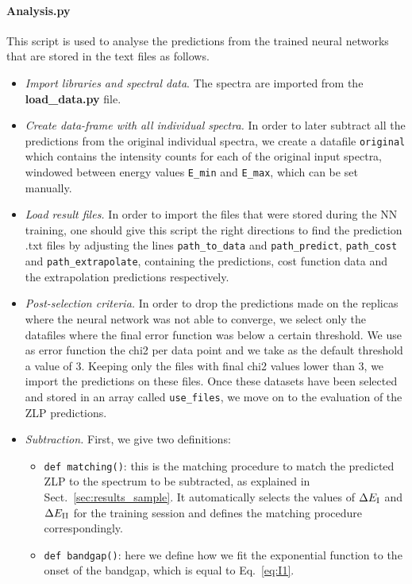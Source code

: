 \noindent
\paragraph{Analysis.py}
This script is used to analyse the predictions from the trained
neural networks that are stored in the text files as follows.

\begin{itemize}
  
\item {\it Import libraries and spectral data}.
The spectra are imported from the {\bf load\_data.py} file.

\item {\it Create data-frame with all individual spectra.}
In order to later subtract all the predictions from the original individual spectra, we create a datafile
{\tt original} which contains the intensity counts for each of the original input spectra, windowed 
between energy values {\tt E\_min} and {\tt E\_max}, which can be set manually.

\item {\it Load result files.}
In order to import the files that were stored during the NN training, 
one should give this script the right directions to find the prediction .txt files
by adjusting the lines {\tt path\_to\_data} and {\tt path\_predict}, {\tt path\_cost} and {\tt path\_extrapolate}, 
containing the predictions, cost function data and the extrapolation predictions respectively.
%

\item {\it Post-selection criteria.}
In order to drop the predictions made on the replicas where the neural network was not able to converge,
we select only the datafiles where the final error function was below a certain threshold. 
%
We use as error function the chi2 per data point and we take as the default threshold a value of 3. 
%
Keeping only the files with final chi2 values lower than 3, we import the predictions on these files.
%
Once these datasets have been selected and stored in an array called {\tt use\_files},
we move on to the evaluation of the ZLP predictions. 
%

\item {\it Subtraction.}
%
First, we give two definitions: 

\begin{itemize}
\item {\tt def matching()}: this is the matching procedure to match the predicted ZLP to the spectrum
to be subtracted, as explained in Sect.~\ref{sec:results_sample}. 
%
It automatically selects the
values of $\Delta E_{\rm I}$ and $\Delta E_{\rm II}$ for the training session and defines the matching procedure
correspondingly.
\item {\tt def bandgap()}: here we define how we fit the exponential function to the onset of the bandgap,
which is equal to Eq.~\ref{eq:I1}. 
\end{itemize}



\end{itemize}
